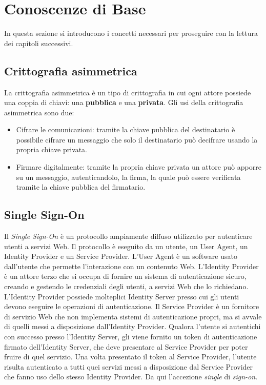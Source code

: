 \chapter{Conoscenze di Base}
\label{conoscenze}

In questa sezione si introducono i concetti necessari per proseguire con la lettura dei capitoli successivi. 

\section{Crittografia asimmetrica}
\label{asimmetrica}

La crittografia asimmetrica è un tipo di crittografia in cui ogni attore possiede una coppia di chiavi: una \textbf{pubblica} e una \textbf{privata}. Gli usi della crittografia asimmetrica sono due:
\begin{itemize}
	\item Cifrare le comunicazioni: tramite la chiave pubblica del destinatario è possibile cifrare un messaggio che solo il destinatario può decifrare usando la propria chiave privata.
	\item Firmare digitalmente: tramite la propria chiave privata un attore può apporre su un messaggio, autenticandolo, la firma, la quale può essere verificata tramite la chiave pubblica del firmatario.
\end{itemize}

\section{Single Sign-On}
\label{sso}


Il \emph{Single Sign-On} è un protocollo ampiamente diffuso utilizzato per autenticare utenti a servizi Web. Il protocollo è eseguito da un utente, un User Agent, un Identity Provider e un Service Provider. L'User Agent è un software usato dall'utente che permette l'interazione con un contenuto Web. L'Identity Provider è un attore terzo che si occupa di fornire un sistema di autenticazione sicuro, creando e gestendo le credenziali degli utenti, a servizi Web che lo richiedano. L'Identity Provider possiede molteplici Identity Server presso cui gli utenti devono eseguire le operazioni di autenticazione. Il Service Provider è un fornitore di servizio Web che non implementa sistemi di autenticazione propri, ma si avvale di quelli messi a disposizione dall'Identity Provider. Qualora l'utente si autentichi con successo presso l'Identity Server, gli viene fornito un token di autenticazione firmato dell'Identity Server, che deve presentare al Service Provider per poter fruire di quel servizio.  Una volta presentato il token al Service Provider, l'utente risulta autenticato a tutti quei servizi messi a disposizione dal Service Provider che fanno uso dello stesso Identity Provider. Da qui l'accezione \emph{single} di \emph{sign-on}.

